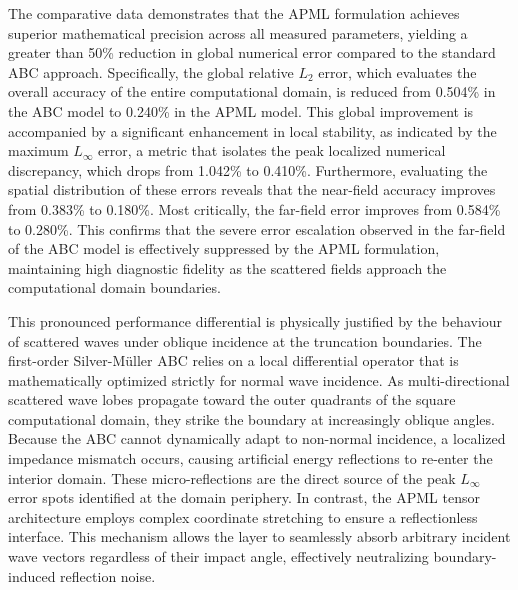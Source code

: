 \documentclass[class=report, crop=false]{standalone}
\begin{document}
The comparative data demonstrates that the APML formulation achieves superior mathematical precision across all measured parameters, yielding a greater than 50\% reduction in global numerical error compared to the standard ABC approach. Specifically, the global relative $L_2$ error, which evaluates the overall accuracy of the entire computational domain, is reduced from 0.504\% in the ABC model to 0.240\% in the APML model. This global improvement is accompanied by a significant enhancement in local stability, as indicated by the maximum $L_{\infty}$ error, a metric that isolates the peak localized numerical discrepancy, which drops from 1.042\% to 0.410\%. Furthermore, evaluating the spatial distribution of these errors reveals that the near-field accuracy improves from 0.383\% to 0.180\%. Most critically, the far-field error improves from 0.584\% to 0.280\%. This confirms that the severe error escalation observed in the far-field of the ABC model is effectively suppressed by the APML formulation, maintaining high diagnostic fidelity as the scattered fields approach the computational domain boundaries.

\vspace{12pt}

This pronounced performance differential is physically justified by the behaviour of scattered waves under oblique incidence at the truncation boundaries. The first-order Silver-M\"{u}ller ABC relies on a local differential operator that is mathematically optimized strictly for normal wave incidence. As multi-directional scattered wave lobes propagate toward the outer quadrants of the square computational domain, they strike the boundary at increasingly oblique angles. Because the ABC cannot dynamically adapt to non-normal incidence, a localized impedance mismatch occurs, causing artificial energy reflections to re-enter the interior domain. These micro-reflections are the direct source of the peak $L_{\infty}$ error spots identified at the domain periphery. In contrast, the APML tensor architecture employs complex coordinate stretching to ensure a reflectionless interface. This mechanism allows the layer to seamlessly absorb arbitrary incident wave vectors regardless of their impact angle, effectively neutralizing boundary-induced reflection noise.

\vspace{12pt}
\end{document}
